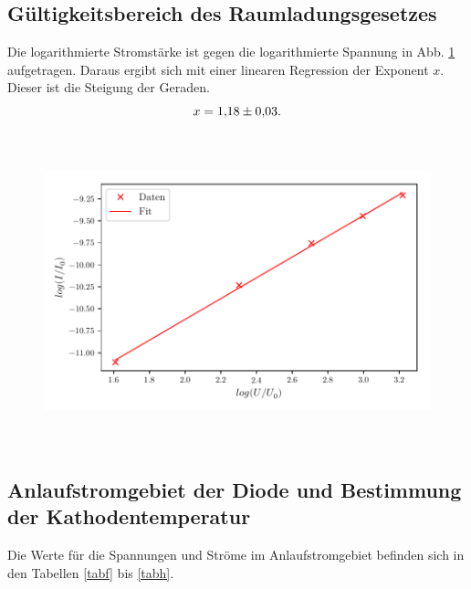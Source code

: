 \subsection{Gültigkeitsbereich des Raumladungsgesetzes}
Die logarithmierte Stromstärke ist gegen die logarithmierte
Spannung in Abb. \ref{fig:plot2} aufgetragen.
Daraus ergibt sich mit einer linearen Regression der
Exponent $x$. Dieser ist die Steigung der Geraden.
\begin{equation*}
    x = \num{1.18 \pm 0.03}.
\end{equation*}

\begin{figure}
    \centering
    \includegraphics[width=15cm, height=9cm]{build/plot2.pdf}
    \caption{}
    \label{fig:plot2}
\end{figure}


\subsection{Anlaufstromgebiet der Diode und Bestimmung der Kathodentemperatur}
Die Werte für die Spannungen und Ströme im Anlaufstromgebiet
befinden sich in den Tabellen \ref{tabf} bis \ref{tabh}.





